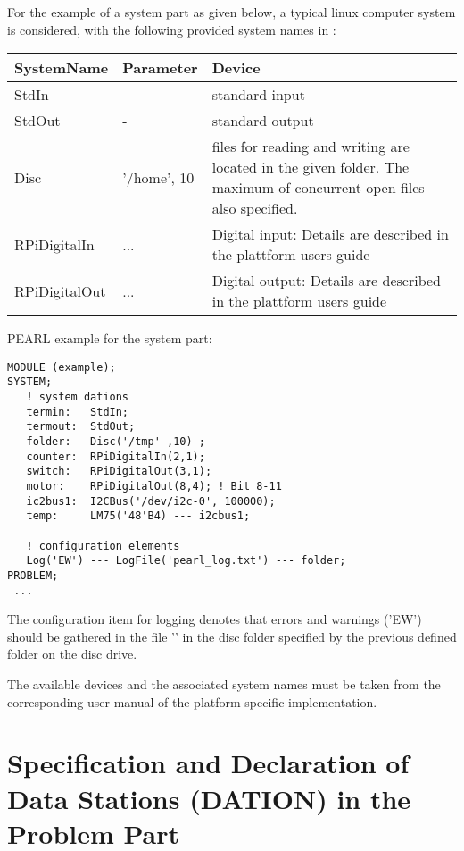 
For the example of a system part as given below, a typical linux computer
system is considered, with the following provided system names in \OpenPEARL{}:

\begin{tabular}{ll@{\x}p{6cm}}
SystemName & Parameter & Device \\ \hline
StdIn  &  - & standard input \\
StdOut  &  - & standard output \\
Disc       & '/home', 10 & files for reading and writing are located in the given folder. The maximum of concurrent open files also specified. \\
RPiDigitalIn & ... & Digital input: Details are described in 
		the plattform users guide \\
RPiDigitalOut & ... & Digital output: Details are described in 
		the plattform users guide \\
\end{tabular}

PEARL example for the system part:

\begin{lstlisting}
MODULE (example); 
SYSTEM; 
   ! system dations 
   termin:   StdIn; 
   termout:  StdOut;
   folder:   Disc('/tmp' ,10) ;  
   counter:  RPiDigitalIn(2,1); 
   switch:   RPiDigitalOut(3,1); 
   motor:    RPiDigitalOut(8,4); ! Bit 8-11
   ic2bus1:  I2CBus('/dev/i2c-0', 100000);
   temp:     LM75('48'B4) --- i2cbus1;

   ! configuration elements 
   Log('EW') --- LogFile('pearl_log.txt') --- folder; 
PROBLEM;
 ...
\end{lstlisting}


The configuration item for logging denotes that errors and warnings ('EW')
should be gathered in the file '' in the disc folder specified
by the previous defined folder on the disc drive.

The available devices and the associated system names must be taken from
the corresponding user manual of the \OpenPEARL{} platform 
specific implementation.

\section{Specification and Declaration of Data Stations (DATION) in 
the Problem Part}   %
\label{sec_dation_problem_part}


